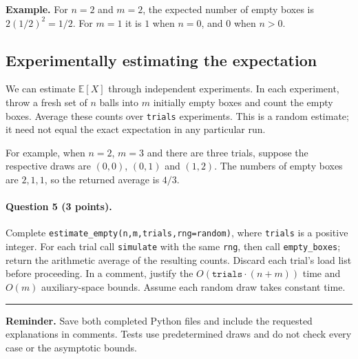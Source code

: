 \documentclass[11pt,a4paper]{article}
\newcommand{\q}[2]{\paragraph{Question #1 (#2 points).}}
\begin{document}
\textbf{Example.} For $n=2$ and $m=2$, the expected number of empty boxes is $2(1/2)^2=1/2$. For $m=1$ it is $1$ when $n=0$, and $0$ when $n>0$.
\newpage
\subsection*{Experimentally estimating the expectation}
We can estimate $\mathbb{E}[X]$ through independent experiments. In each experiment, throw a fresh set of $n$ balls into $m$ initially empty boxes and count the empty boxes. Average these counts over \texttt{trials} experiments. This is a random estimate; it need not equal the exact expectation in any particular run.

For example, when $n=2$, $m=3$ and there are three trials, suppose the respective draws are $(0,0)$, $(0,1)$ and $(1,2)$. The numbers of empty boxes are $2,1,1$, so the returned average is $4/3$.
\q{5}{3} Complete \texttt{estimate\_empty(n,m,trials,rng=random)}, where \texttt{trials} is a positive integer. For each trial call \texttt{simulate} with the same \texttt{rng}, then call \texttt{empty\_boxes}; return the arithmetic average of the resulting counts. Discard each trial's load list before proceeding. In a comment, justify the $O(\texttt{trials}\cdot(n+m))$ time and $O(m)$ auxiliary-space bounds. Assume each random draw takes constant time.

\vspace{1cm}\hrule\vspace{5pt}
\textbf{Reminder.} Save both completed Python files and include the requested explanations in comments. Tests use predetermined draws and do not check every case or the asymptotic bounds.
\end{document}
